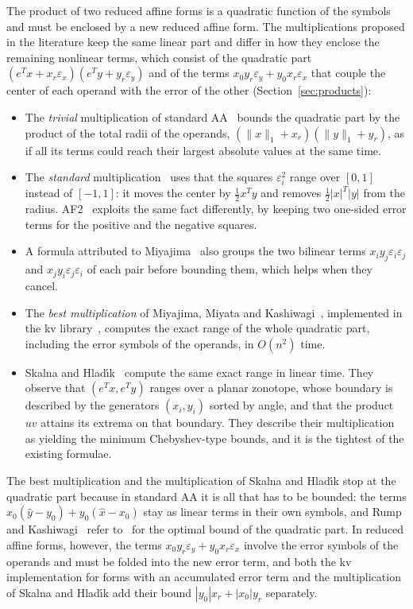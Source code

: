 \documentclass[10pt]{article}
\theoremstyle{definition}
\newcommand{\eps}{\varepsilon}
\newcommand{\ex}{\eps_x}
\newcommand{\ey}{\eps_y}
\begin{document}
The product of two reduced affine forms is a quadratic function of the symbols and must be enclosed by a new reduced affine form. The multiplications proposed in the literature keep the same linear part and differ in how they enclose the remaining nonlinear terms, which consist of the quadratic part $(e^Tx+x_r\ex)(e^Ty+y_r\ey)$ and of the terms $x_0y_r\ey+y_0x_r\ex$ that couple the center of each operand with the error of the other (Section~\ref{sec:products}):
\begin{itemize}
\item The \emph{trivial} multiplication of standard AA~\cite{stolfi1997self} bounds the quadratic part by the product of the total radii of the operands, $(\|x\|_1+x_r)(\|y\|_1+y_r)$, as if all its terms could reach their largest absolute values at the same time.
\item The \emph{standard} multiplication~\cite{kolev2004improved,vu2009enhancing} uses that the squares $\eps_i^2$ range over $[0,1]$ instead of $[-1,1]$: it moves the center by $\tfrac12x^Ty$ and removes $\tfrac12|x|^T|y|$ from the radius. AF2~\cite{messine2002extentions} exploits the same fact differently, by keeping two one-sided error terms for the positive and the negative squares.
\item A formula attributed to Miyajima~\cite{skalna2017new} also groups the two bilinear terms $x_iy_j\eps_i\eps_j$ and $x_jy_i\eps_j\eps_i$ of each pair before bounding them, which helps when they cancel.
\item The \emph{best multiplication} of Miyajima, Miyata and Kashiwagi~\cite{miyajima2003best}, implemented in the kv library~\cite{kvlib}, computes the exact range of the whole quadratic part, including the error symbols of the operands, in $O(n^2)$ time.
\item Skalna and Hlad\'{\i}k~\cite{skalna2017new} compute the same exact range in linear time. They observe that $(e^Tx,e^Ty)$ ranges over a planar zonotope, whose boundary is described by the generators $(x_i,y_i)$ sorted by angle, and that the product $uv$ attains its extrema on that boundary. They describe their multiplication as yielding the minimum Chebyshev-type bounds, and it is the tightest of the existing formulae.
\end{itemize}
The best multiplication and the multiplication of Skalna and Hlad\'{\i}k stop at the quadratic part because in standard AA it is all that has to be bounded: the terms $x_0(\hat y-y_0)+y_0(\hat x-x_0)$ stay as linear terms in their own symbols, and Rump and Kashiwagi~\cite{rump2015implementation} refer to~\cite{miyajima2003best} for the optimal bound of the quadratic part. In reduced affine forms, however, the terms $x_0y_r\ey+y_0x_r\ex$ involve the error symbols of the operands and must be folded into the new error term, and both the kv implementation for forms with an accumulated error term and the multiplication of Skalna and Hlad\'{\i}k add their bound $|y_0|x_r+|x_0|y_r$ separately.
\end{document}
